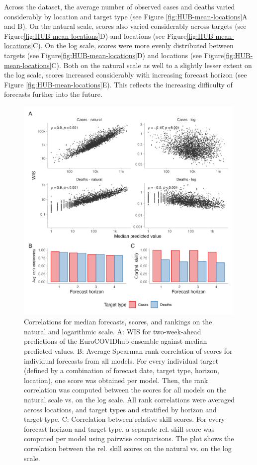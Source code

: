 \documentclass{article}
\begin{document}
Across the dataset, the average number of observed cases and deaths varied considerably by location and target type (see Figure \ref{fig:HUB-mean-locations}A and B). On the natural scale, scores also varied considerably across targets (see Figure\ref{fig:HUB-mean-locations}D) and locations (see Figure\ref{fig:HUB-mean-locations}C). On the log scale, scores were more evenly distributed between targets (see Figure\ref{fig:HUB-mean-locations}D) and locations (see Figure\ref{fig:HUB-mean-locations}C). Both on the natural scale as well to a slightly lesser extent on the log scale, scores increased considerably with increasing forecast horizon (see Figure \ref{fig:HUB-mean-locations}E). This reflects the increasing difficulty of forecasts further into the future. 

\begin{figure}[h!]
    \centering
    \includegraphics[width=0.99\textwidth]{output/figures/HUB-correlations.png}
    \caption{Correlations for median forecasts, scores, and rankings on the natural and logarithmic scale. A: WIS for two-week-ahead predictions of the EuroCOVIDhub-ensemble against median predicted values. B: Average Spearman rank correlation of scores for individual forecasts from all models. For every individual target (defined by a combination of forecast date, target type, horizon, location), one score was obtained per model. Then, the rank correlation was computed between the scores for all models on the natural scale vs. on the log scale. All rank correlations were averaged across locations, and target types and stratified by horizon and target type. C: Correlation between relative skill scores. For every forecast horizon and target type, a separate rel. skill score was computed per model using pairwise comparisons. The plot shows the correlation between the rel. skill scores on the natural vs. on the log scale.}
    \label{fig:HUB-cors}
\end{figure}
\end{document}
